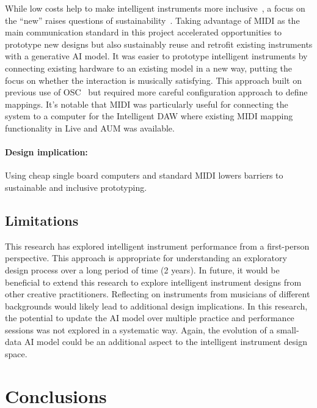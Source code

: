 \documentclass[sigconf]{nimeart}
\begin{document}
While low costs help to make intelligent instruments more inclusive~\cite{jourdan_nime_ml_review}, a focus on the ``new'' raises questions of sustainability~\cite{sustainable-internet-of-musical-things, the_o_in_nime}. 
Taking advantage of MIDI as the main communication standard in this project accelerated opportunities to prototype new designs but also sustainably reuse and retrofit existing instruments with a generative AI model.
It was easier to prototype intelligent instruments by connecting existing hardware to an existing model in a new way, putting the focus on whether the interaction is musically satisfying.
This approach built on previous use of OSC~\cite{Martin2019} but required more careful configuration approach to define mappings.
It's notable that MIDI was particularly useful for connecting the system to a computer for the Intelligent DAW where existing MIDI mapping functionality in Live and AUM was available.

\paragraph{Design implication:} Using cheap single board computers and standard MIDI lowers barriers to sustainable and inclusive prototyping.

\subsection{Limitations}

This research has explored intelligent instrument performance from a first-person perspective. 
This approach is appropriate for understanding an exploratory design process over a long period of time (2 years).
In future, it would be beneficial to extend this research to explore intelligent instrument designs from other creative practitioners.
Reflecting on instruments from musicians of different backgrounds would likely lead to additional design implications.
In this research, the potential to update the AI model over multiple practice and performance sessions was not explored in a systematic way. Again, the evolution of a small-data AI model could be an additional aspect to the intelligent instrument design space.

\section{Conclusions}\label{conclusions}
\end{document}
